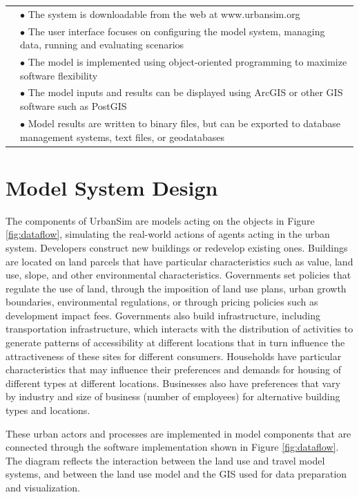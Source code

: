 \begin{table}[htp]
\begin{center}
\begin{tabular}{ p{1.5in}  p{4.4in}  }
& $\bullet$  The system is downloadable from the web at www.urbansim.org\\
&  $\bullet$   The user interface focuses on configuring the model system, managing data, running and evaluating scenarios\\
& $\bullet$    The model is implemented using object-oriented programming to maximize software flexibility\\
&  $\bullet$   The model inputs and results can be displayed using ArcGIS or other GIS software such as PostGIS\\
&  $\bullet$   Model results are written to binary files, but can be exported to database management systems, text files, or geodatabases\\
\bottomrule
\end{tabular}
\end{center}
\end{table}

\section{Model System Design}

The components of UrbanSim are models acting on the objects in Figure
\ref{fig:dataflow}, simulating the real-world actions of agents acting in the urban system.  Developers construct new buildings or redevelop existing ones.  Buildings are located on land parcels that have particular characteristics such as value, land use, slope, and other environmental characteristics.  Governments set policies that regulate the use of land, through the imposition of land use plans, urban growth boundaries, environmental regulations, or through pricing policies such as development impact fees.  Governments also build infrastructure, including transportation infrastructure, which interacts with the distribution of activities to generate patterns of accessibility at different locations that in turn influence the attractiveness of these sites for different consumers.  Households have particular characteristics that may influence their preferences and demands for housing of different types at different locations.  Businesses also have preferences that vary by industry and size of business (number of employees) for alternative building types and locations.

These urban actors and processes are implemented in model components that are connected through the software implementation shown in Figure \ref{fig:dataflow}. The diagram reflects the interaction between the land use and travel model systems, and between the land use model and the GIS used for data preparation and visualization.

